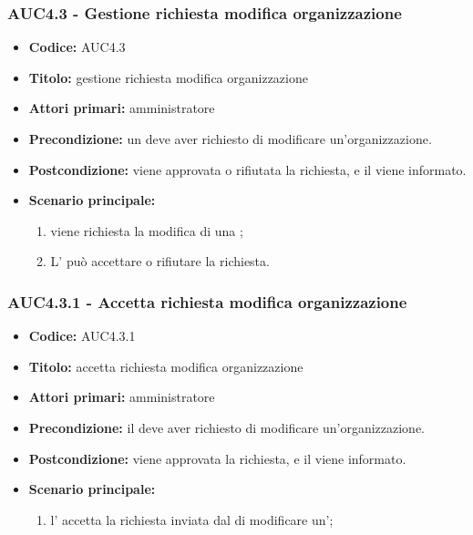 \documentclass[casi-duso]{subfiles}
\begin{document}
\subsubsection{AUC4.3 - Gestione richiesta modifica organizzazione}%
\label{subsub:AUC4.3}
\begin{itemize}
  \item \textbf{Codice:} AUC4.3
  \item \textbf{Titolo:} gestione richiesta modifica organizzazione
  \item \textbf{Attori primari:} amministratore
  \item \textbf{Precondizione:} un  deve aver richiesto di modificare un'organizzazione.
  \item \textbf{Postcondizione:} viene approvata o rifiutata la richiesta, e il  viene informato.
  \item \textbf{Scenario principale:}
  \begin{enumerate}
    \item viene richiesta la modifica di una ;
    \item L' può accettare o rifiutare la richiesta.
  \end{enumerate}
\end{itemize}

\subsubsection{AUC4.3.1 - Accetta richiesta modifica organizzazione}%
\label{subsub:AUC4.3.1}
\begin{itemize}
  \item \textbf{Codice:} AUC4.3.1
  \item \textbf{Titolo:} accetta richiesta modifica organizzazione
  \item \textbf{Attori primari:} amministratore
  \item \textbf{Precondizione:} il  deve aver richiesto di modificare un'organizzazione.
  \item \textbf{Postcondizione:} viene approvata la richiesta, e il  viene informato.
  \item \textbf{Scenario principale:}
  \begin{enumerate}
    \item  l' accetta la richiesta inviata dal  di modificare un';
  \end{enumerate}
\end{itemize}
\end{document}
